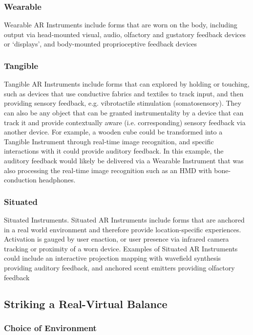 \subsubsection{Wearable}
Wearable AR Instruments include forms that are worn on the body, including output via head-mounted visual, audio, olfactory and gustatory feedback devices or `displays', and body-mounted proprioceptive feedback devices

\subsubsection{Tangible}
Tangible AR Instruments include forms that can explored by holding or touching, such as devices that use conductive fabrics and textiles to track input, and then providing sensory feedback, e.g. vibrotactile stimulation (somatosensory). They can also be any object that can be granted instrumentality by a device that can track it and provide contextually aware (i.e. corresponding) sensory feedback via another device. For example, a wooden cube could be transformed into a Tangible Instrument through real-time image recognition, and specific interactions with it could provide auditory feedback. In this example, the auditory feedback would likely be delivered via a Wearable Instrument that was also processing the real-time image recognition such as an HMD with bone-conduction headphones.

\subsubsection{Situated}
Situated Instruments. Situated AR Instruments include forms that are anchored in a real world environment and therefore provide location-specific experiences. Activation is gauged by user enaction, or user presence via infrared camera tracking or proximity of a worn device. Examples of Situated AR Instruments could include an interactive projection mapping with wavefield synthesis providing auditory feedback, and anchored scent emitters providing olfactory feedback

\subsection{Striking a Real-Virtual Balance} \label{sec: method-patterns-environment}
\subsubsection{Choice of Environment}
